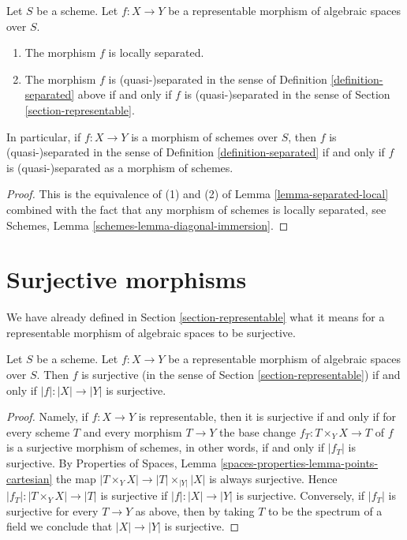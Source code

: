 \begin{lemma}
\label{lemma-match-separated}
Let $S$ be a scheme.
Let $f : X \to Y$ be a representable morphism of algebraic spaces over $S$.
\begin{enumerate}
\item The morphism $f$ is locally separated.
\item The morphism $f$ is (quasi-)separated in the sense of
Definition \ref{definition-separated}
above if and only if $f$ is (quasi-)separated in the sense of
Section \ref{section-representable}.
\end{enumerate}
In particular, if $f : X \to Y$ is a morphism of schemes over $S$, then
$f$ is (quasi-)separated in the sense of
Definition \ref{definition-separated}
if and only if $f$ is (quasi-)separated as a morphism of schemes.
\end{lemma}

\begin{proof}
This is the equivalence of (1) and (2) of
Lemma \ref{lemma-separated-local}
combined with the fact that any morphism of schemes is locally separated, see
Schemes, Lemma \ref{schemes-lemma-diagonal-immersion}.
\end{proof}











\section{Surjective morphisms}
\label{section-surjective}

\noindent
We have already defined in Section \ref{section-representable}
what it means for a representable morphism of algebraic spaces
to be surjective.

\begin{lemma}
\label{lemma-surjective-representable}
Let $S$ be a scheme. Let $f : X \to Y$ be a representable
morphism of algebraic spaces over $S$. Then
$f$ is surjective (in the sense of Section \ref{section-representable})
if and only if $|f| : |X| \to |Y|$ is surjective.
\end{lemma}

\begin{proof}
Namely, if $f : X \to Y$ is representable, then it is surjective if and only if
for every scheme $T$ and every morphism $T \to Y$ the base change
$f_T : T \times_Y X \to T$ of $f$ is a surjective morphism of schemes,
in other words, if and only if $|f_T|$ is surjective. By
Properties of Spaces, Lemma \ref{spaces-properties-lemma-points-cartesian}
the map $|T \times_Y X| \to |T| \times_{|Y|} |X|$ is always surjective.
Hence $|f_T| : |T \times_Y X| \to |T|$ is surjective if $|f| : |X| \to |Y|$
is surjective. Conversely, if $|f_T|$ is surjective
for every $T \to Y$ as above, then by taking $T$ to be the spectrum of a
field we conclude that $|X| \to |Y|$ is surjective.
\end{proof}

